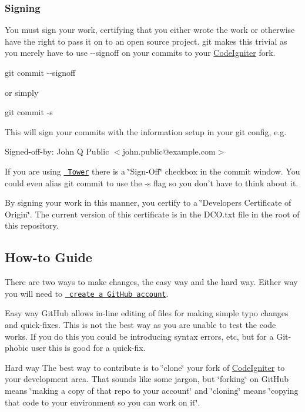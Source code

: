 \subsubsection*{Signing}

You must sign your work, certifying that you either wrote the work or otherwise have the right to pass it on to an open source project. git makes this trivial as you merely have to use {\ttfamily -\/-\/signoff} on your commits to your \mbox{\hyperlink{a00009}{Code\+Igniter}} fork.

{\ttfamily git commit -\/-\/signoff}

or simply

{\ttfamily git commit -\/s}

This will sign your commits with the information setup in your git config, e.\+g.

{\ttfamily Signed-\/off-\/by\+: John Q Public $<$john.\+public@example.\+com$>$}

If you are using \href{http://www.git-tower.com/}{\texttt{ Tower}} there is a \char`\"{}\+Sign-\/\+Off\char`\"{} checkbox in the commit window. You could even alias git commit to use the {\ttfamily -\/s} flag so you don’t have to think about it.

By signing your work in this manner, you certify to a \char`\"{}\+Developer\textquotesingle{}s Certificate of Origin\char`\"{}. The current version of this certificate is in the {\ttfamily D\+C\+O.\+txt} file in the root of this repository.

\subsection*{How-\/to Guide}

There are two ways to make changes, the easy way and the hard way. Either way you will need to \href{https://github.com/signup/free}{\texttt{ create a Git\+Hub account}}.

Easy way Git\+Hub allows in-\/line editing of files for making simple typo changes and quick-\/fixes. This is not the best way as you are unable to test the code works. If you do this you could be introducing syntax errors, etc, but for a Git-\/phobic user this is good for a quick-\/fix.

Hard way The best way to contribute is to \char`\"{}clone\char`\"{} your fork of \mbox{\hyperlink{a00009}{Code\+Igniter}} to your development area. That sounds like some jargon, but \char`\"{}forking\char`\"{} on Git\+Hub means \char`\"{}making a copy of that repo to your account\char`\"{} and \char`\"{}cloning\char`\"{} means \char`\"{}copying that code to your environment so you can work on it\char`\"{}.


